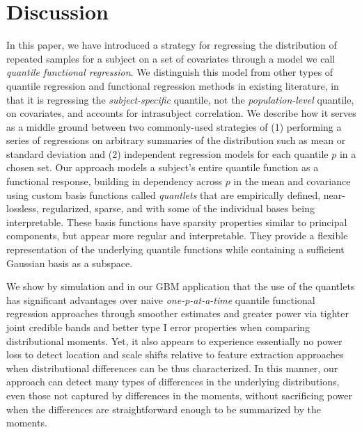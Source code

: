 \documentclass[11pt]{article}
\begin{document}

\section{{\bf Discussion }}


In this paper, we have introduced a strategy for regressing the distribution of repeated samples for a subject on a set of covariates through a model we call \textit{quantile functional regression}.  We distinguish this model from other types of quantile regression and functional regression  methods in existing literature, in that it is regressing the \textit{subject-specific} quantile, not the \textit{population-level} quantile, on covariates, and accounts for intrasubject correlation.  We describe how it serves as a middle ground between two commonly-used strategies of (1) performing a series of regressions on arbitrary summaries of the distribution such as mean or standard deviation and (2) independent regression models for each quantile $p$ in a chosen set.  Our approach models a subject's entire quantile function as a functional response, building in dependency across $p$ in the mean and covariance using custom basis functions called \textit{quantlets} that are empirically defined, near-lossless, regularized, sparse, and with some of the individual bases being interpretable.  These basis functions have sparsity properties similar to principal components, but appear more regular and interpretable.  They provide a flexible representation of the underlying quantile functions while containing a sufficient Gaussian basis as a subspace. 


We show by simulation and in our GBM application that the use of the quantlets has significant advantages over naive \textit{one-p-at-a-time} quantile functional regression approaches through smoother estimates and greater power via tighter joint credible bands and better type I error properties when comparing distributional moments.  Yet, it also appears to experience essentially no power loss to detect location and scale shifts relative to feature extraction approaches when distributional differences can be thus characterized.    In this manner, our approach can detect many types of differences in the underlying distributions, even those not captured by differences in the moments, without sacrificing power when the differences are straightforward enough to be summarized by the moments.
\end{document}
